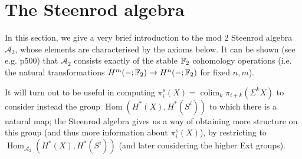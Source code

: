 \documentclass{MetricNotes2023}
\def\bb{\ensuremath\mathbb}
\def\subq{\ensuremath\subseteq}
\def\inj{\ensuremath\hookrightarrow}
\def\del{\ensuremath\partial}
\def\A{\ensuremath{\mathscr{A}_2}}
\DeclareMathOperator{\colim}{colim}
\DeclareMathOperator{\Hom}{Hom}
\begin{document}

\section{The Steenrod algebra}\label{2503221247}

In this section, we give a very brief introduction to the mod 2 Steenrod algebra \(\A\), whose elements are characterised by the axioms below. It can be shown (see e.g. \autocite{hatcher} p500) that \(\A\) consists exactly of the stable \(\bb{F}_2\) cohomology operations (i.e. the natural transformations \(H^m(-;\bb{F}_2)\to H^n(-; \bb{F}_2)\) for fixed \(n,m\)). 

It will turn out to be useful in computing \(\pi_i^s(X)=\colim_k \pi_{i+k}(\Sigma^k X)\) to consider instead the group \(\Hom(H^*(X), H^*(S^i))\) to which there is a natural map; the Steenrod algebra gives us a way of obtaining more structure on this group (and thus more information about \(\pi_i^s(X)\)), by restricting to \(\Hom_{\A}(H^*(X), H^*(S^i))\) (and later considering the higher Ext groups).  
\end{document}
